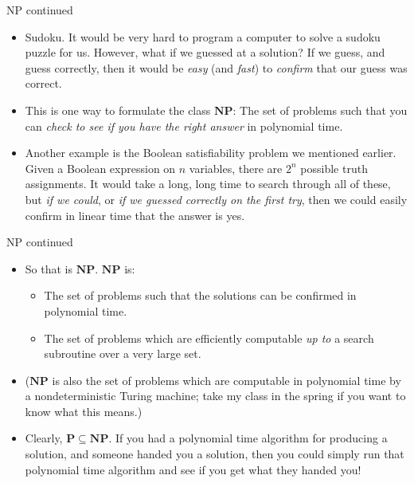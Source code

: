 \documentclass{beamer}
\begin{document}
\begin{frame}{NP continued}
    \begin{itemize}
        \item Sudoku. It would be very hard to program a computer to solve a sudoku puzzle for us. However, what if we guessed at a solution? If we guess, and guess correctly, then it would be \emph{easy} (and \emph{fast}) to \emph{confirm} that our guess was correct. \pause 
        \item This is one way to formulate the class $\mathbf{NP}$: The set of problems such that you can \emph{check to see if you have the right answer} in polynomial time. 
        \item Another example is the Boolean satisfiability problem we mentioned earlier. Given a Boolean expression on $n$ variables, there are $2^n$ possible truth assignments. It would take a long, long time to search through all of these, but \emph{if we could}, or \emph{if we guessed correctly on the first try}, then we could easily confirm in linear time that the answer is yes. 
    \end{itemize}
\end{frame}

\begin{frame}{NP continued}
    \begin{itemize}
        \item So that is $\mathbf{NP}$. $\mathbf{NP}$ is:
        \begin{itemize}
            \item The set of problems such that the solutions can be confirmed in polynomial time.
            \item The set of problems which are efficiently computable \emph{up to} a search subroutine over a very large set.
        \end{itemize}
        \item ($\mathbf{NP}$ is also the set of problems which are computable in polynomial time by a nondeterministic Turing machine; take my class in the spring if you want to know what this means.) 
        \item Clearly, $\mathbf{P} \subseteq \mathbf{NP}$. If you had a polynomial time algorithm for producing a solution, and someone handed you a solution, then you could simply run that polynomial time algorithm and see if you get what they handed you!
    \end{itemize}
\end{frame}
\end{document}
